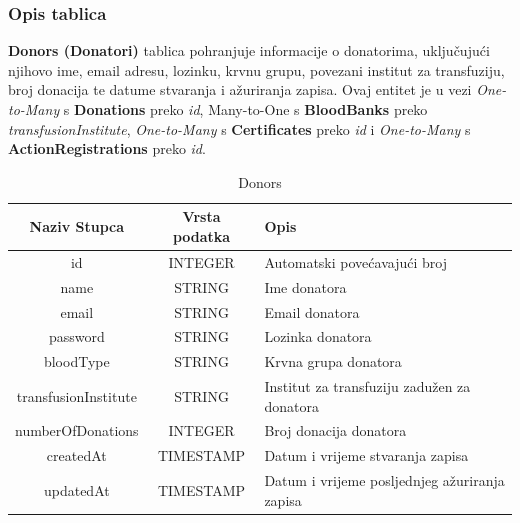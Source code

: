 \documentclass[12pt]{article}
\begin{document}
\clearpage %
\subsubsection{Opis tablica}

\noindent
\textbf{Donors (Donatori)} tablica pohranjuje informacije o donatorima, uključujući
njihovo ime, email adresu, lozinku, krvnu grupu, povezani institut za transfuziju,
broj donacija te datume stvaranja i ažuriranja zapisa. Ovaj entitet je u vezi \textit{One-to-Many}
s \textbf{Donations} preko \textit{id}, {Many-to-One} s \textbf{BloodBanks}
preko \textit{transfusionInstitute}, \textit{One-to-Many} s \textbf{Certificates}
preko \textit{id} i \textit{One-to-Many} s \textbf{ActionRegistrations} preko \textit{id}.
\begin{table}[H]
	\renewcommand{\arraystretch}{2}
	\centering
	\begin{tabularx}
		{1\textwidth}{|c|c|X|} \hline \textbf{Naziv Stupca} & \textbf{Vrsta
		podatka} & \textbf{Opis}    \\ \hline \cellcolor{LightGreen} id & INTEGER &
		Automatski povećavajući broj \\ \hline name & STRING & Ime donatora \\
		\hline email & STRING & Email donatora \\ \hline password & STRING
		         & Lozinka donatora \\ \hline bloodType & STRING & Krvna grupa donatora \\
		\hline \cellcolor{LightBlue} transfusionInstitute & STRING & Institut za transfuziju
		zadužen za donatora \\ \hline numberOfDonations & INTEGER & Broj donacija donatora
		\\ \hline createdAt & TIMESTAMP & Datum i vrijeme stvaranja zapisa \\ \hline
		updatedAt & TIMESTAMP & Datum i vrijeme posljednjeg ažuriranja zapisa \\ \hline
	\end{tabularx}
	\caption{Donors}
	\label{tab:my_label}
\end{table}
\clearpage %
\end{document}

